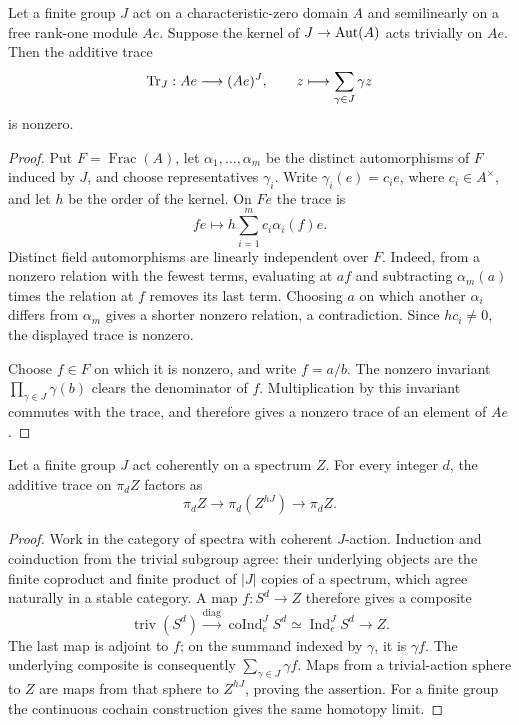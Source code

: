 \begin{lemma}\label{det:semilinear-trace}
Let a finite group \(J\) act on a characteristic-zero domain \(A\)
and semilinearly on a free rank-one module \(Ae\).
Suppose the kernel of \(J\to\operatorname{Aut}(A)\) acts trivially on \(Ae\).
Then the additive trace
\[
 \operatorname{Tr}_J:Ae\longrightarrow (Ae)^J,\qquad
 z\longmapsto\sum_{\gamma\in J}\gamma z
\]
is nonzero.
\end{lemma}

\begin{proof}
Put \(F=\operatorname{Frac}(A)\), let
\(\alpha_1,\ldots,\alpha_m\) be the distinct automorphisms of \(F\)
induced by \(J\), and choose representatives \(\gamma_i\).
Write \(\gamma_i(e)=c_i e\), where \(c_i\in A^\times\), and let
\(h\) be the order of the kernel.  On \(Fe\) the trace is
\[
 fe\longmapsto
 h\sum_{i=1}^m c_i\alpha_i(f)e .
\]
Distinct field automorphisms are linearly independent over \(F\).
Indeed, from a nonzero relation with the fewest terms, evaluating at
\(af\) and subtracting \(\alpha_m(a)\) times the relation at \(f\)
removes its last term.  Choosing \(a\) on which another
\(\alpha_i\) differs from \(\alpha_m\) gives a shorter nonzero
relation, a contradiction.
Since \(hc_i\ne0\), the displayed trace is nonzero.

Choose \(f\in F\) on which it is nonzero, and write \(f=a/b\).
The nonzero invariant
\(\prod_{\gamma\in J}\gamma(b)\) clears the denominator of \(f\).
Multiplication by this invariant commutes with the trace, and
therefore gives a nonzero trace of an element of \(Ae\).
\end{proof}

\begin{lemma}\label{det:homotopy-transfer}
Let a finite group \(J\) act coherently on a spectrum \(Z\).
For every integer \(d\), the additive trace on \(\pi_d Z\)
factors as
\[
 \pi_d Z\longrightarrow \pi_d(Z^{hJ})
       \longrightarrow \pi_d Z .
\]
\end{lemma}

\begin{proof}
Work in the category of spectra with coherent \(J\)-action.
Induction and coinduction from the trivial subgroup agree: their
underlying objects are the finite coproduct and finite product of
\(|J|\) copies of a spectrum, which agree naturally in a stable
category.  A map \(f:S^d\to Z\) therefore gives a composite
\[
 \operatorname{triv}(S^d)
 \xrightarrow{\mathrm{diag}}
 \operatorname{coInd}_e^J S^d
 \simeq \operatorname{Ind}_e^J S^d
 \longrightarrow Z.
\]
The last map is adjoint to \(f\); on the summand indexed by
\(\gamma\), it is \(\gamma f\).
The underlying composite is consequently
\(\sum_{\gamma\in J}\gamma f\).
Maps from a trivial-action sphere to \(Z\) are maps from that sphere
to \(Z^{hJ}\), proving the assertion.  For a finite group the
continuous cochain construction gives the same homotopy limit.
\end{proof}

